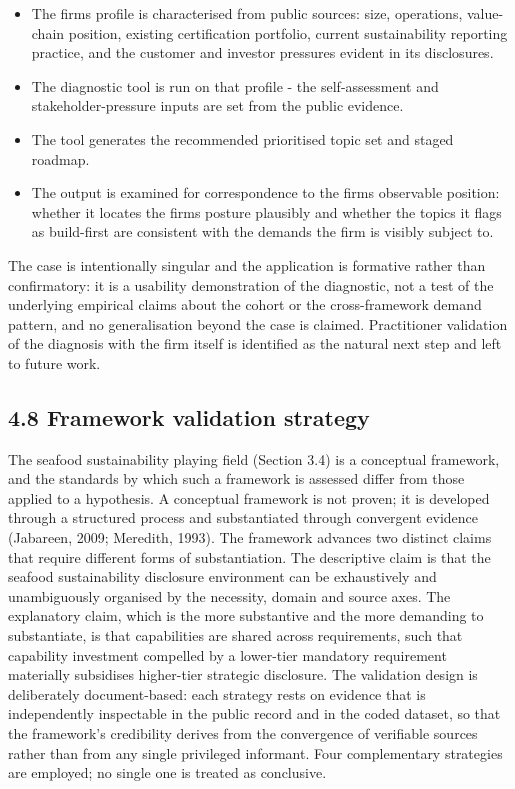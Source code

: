 \documentclass[
]{article}
\begin{document}
\begin{itemize}
\item
  The firm\textquotesingle s profile is characterised from public
  sources: size, operations, value-chain position, existing certification
  portfolio, current sustainability reporting practice, and the customer
  and investor pressures evident in its disclosures.
\item
  The diagnostic tool is run on that profile - the self-assessment and
  stakeholder-pressure inputs are set from the public evidence.
\item
  The tool generates the recommended prioritised topic set and staged
  roadmap.
\item
  The output is examined for correspondence to the firm\textquotesingle s
  observable position: whether it locates the firm\textquotesingle s
  posture plausibly and whether the topics it flags as build-first are
  consistent with the demands the firm is visibly subject to.
\end{itemize}

The case is intentionally singular and the application is formative rather
than confirmatory: it is a usability demonstration of the diagnostic, not
a test of the underlying empirical claims about the cohort or the
cross-framework demand pattern, and no generalisation beyond the case is
claimed. Practitioner validation of the diagnosis with the firm itself is
identified as the natural next step and left to future work.

\subsection{4.8 Framework validation
strategy}\label{framework-validation-strategy}

The seafood sustainability playing field (Section 3.4) is a conceptual
framework, and the standards by which such a framework is assessed
differ from those applied to a hypothesis. A conceptual framework is not
proven; it is developed through a structured process and substantiated
through convergent evidence (Jabareen, 2009; Meredith, 1993). The
framework advances two distinct claims that require different forms of
substantiation. The descriptive claim is that the seafood sustainability
disclosure environment can be exhaustively and unambiguously organised
by the necessity, domain and source axes. The explanatory claim, which
is the more substantive and the more demanding to substantiate, is that
capabilities are shared across requirements, such that capability
investment compelled by a lower-tier mandatory requirement materially
subsidises higher-tier strategic disclosure. The validation design is
deliberately document-based: each strategy rests on evidence that is
independently inspectable in the public record and in the coded dataset,
so that the framework's credibility derives from the convergence of
verifiable sources rather than from any single privileged informant.
Four complementary strategies are employed; no single one is treated as
conclusive.
\end{document}
